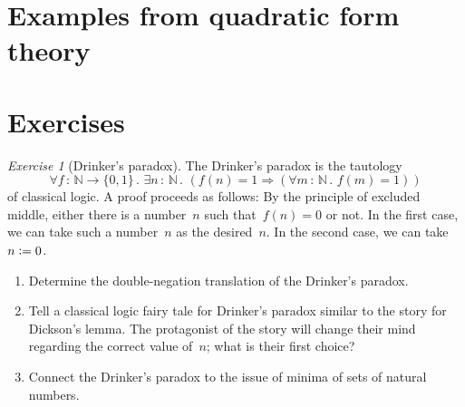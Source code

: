 \documentclass[10pt,reqno,a4paper,openany]{amsbook}
\theoremstyle{definition}
\theoremstyle{plain}
\theoremstyle{remark}
\newcommand{\NN}{\mathbb{N}}
\newcommand{\?}{\,{:}\,}
\renewcommand{\_}{\mathpunct{.}\,}
\newcommand{\defeq}{\vcentcolon=}
\newtheorem{exercise}{Exercise}[chapter]
\begin{document}
\section{Examples from quadratic form theory}
\newpage

\section{Exercises}

\begin{exercise}[Drinker's paradox]
The Drinker's paradox is the tautology
\[ \forall f \? \NN \to \{0,1\}\_ \exists n \? \NN\_ (f(n) = 1
\Rightarrow (\forall m \? \NN\_ f(m) = 1)) \]
of classical logic. A proof proceeds as follows: By the principle of
excluded middle, either there is a number~$n$ such that~$f(n) = 0$ or not. In
the first case, we can take such a number~$n$ as the desired~$n$. In the second
case, we can take~$n \defeq 0$.
\begin{enumerate}
\item Determine the double-negation translation of the Drinker's paradox.
\item Tell a classical logic fairy tale for Drinker's paradox similar to the
story for Dickson's lemma. The protagonist of the story will change their mind
regarding the correct value of~$n$; what is their first choice?
\item Connect the Drinker's paradox to the issue of minima of sets of natural
numbers.
\end{enumerate}
\end{exercise}
\end{document}
